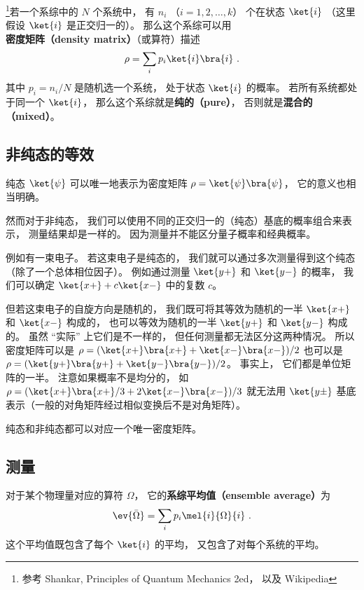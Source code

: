

\footnote{参考 Shankar, Principles of Quantum Mechanics 2ed， 以及 Wikipedia}若一个系综中的 $N$ 个系统中， 有 $n_i$ （$i = 1,2,\dots,k$） 个在状态 $\ket{i}$ （这里假设 $\ket{i}$ 是正交归一的）。 那么这个系综可以用\textbf{密度矩阵（density matrix）}（或算符）描述
\begin{equation}\label{eq_denMat_1}
\rho = \sum_i p_i\ket{i}\bra{i}   ~.
\end{equation}
其中 $p_i = n_i/N$ 是随机选一个系统， 处于状态 $\ket{i}$ 的概率。 若所有系统都处于同一个 $\ket{i}$， 那么这个系综就是\textbf{纯的（pure）}， 否则就是\textbf{混合的（mixed）}。

\subsection{非纯态的等效}
纯态 $\ket{\psi}$ 可以唯一地表示为密度矩阵 $\rho = \ket{\psi}\bra{\psi}$， 它的意义也相当明确。

然而对于非纯态， 我们可以使用不同的正交归一的（纯态）基底的概率组合来表示， 测量结果却是一样的。 因为测量并不能区分量子概率和经典概率。

例如有一束电子。 若这束电子是纯态的， 我们就可以通过多次测量得到这个纯态（除了一个总体相位因子）。 例如通过测量 $\ket{y+}$ 和 $\ket{y-}$ 的概率， 我们可以确定 $\ket{x+} + c\ket{x-}$ 中的复数 $c$。

但若这束电子的自旋方向是随机的， 我们既可将其等效为随机的一半 $\ket{x+}$ 和 $\ket{x-}$ 构成的， 也可以等效为随机的一半 $\ket{y+}$ 和 $\ket{y-}$ 构成的。 虽然 “实际” 上它们是不一样的， 但任何测量都无法区分这两种情况。 所以密度矩阵可以是 $\rho = (\ket{x+}\bra{x+} + \ket{x-}\bra{x-})/2$ 也可以是 $\rho = (\ket{y+}\bra{y+} + \ket{y-}\bra{y-})/2$。 事实上， 它们都是单位矩阵的一半。 注意如果概率不是均分的， 如 $\rho = (\ket{x+}\bra{x+}/3 + 2\ket{x-}\bra{x-})/3$ 就无法用 $\ket{y\pm}$ 基底表示（一般的对角矩阵经过相似变换后不是对角矩阵）。

纯态和非纯态都可以对应一个唯一密度矩阵。

\subsection{测量}
对于某个物理量对应的算符 $\Omega$， 它的\textbf{系综平均值（ensemble average）}为
\begin{equation}
\ev{\bar\Omega} = \sum_i p_i \mel{i}{\Omega}{i}~.
\end{equation}
这个平均值既包含了每个 $\ket{i}$ 的平均， 又包含了对每个系统的平均。

